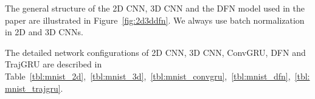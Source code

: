 \documentclass{article}
\begin{document}
The general structure of the 2D CNN, 3D CNN and the DFN model used in the paper are illustrated in Figure~\ref{fig:2d3ddfn}. We always use batch normalization~\cite{ioffe2015batch} in 2D and 3D CNNs.

The detailed network configurations of 2D CNN, 3D CNN, ConvGRU, DFN and TrajGRU are described in Table~\ref{tbl:mnist_2d},~\ref{tbl:mnist_3d},~\ref{tbl:mnist_convgru},~\ref{tbl:mnist_dfn},~\ref{tbl:mnist_trajgru}.

\begin{table}[h!]
  \centering
  \caption{The details of the 2D CNN model. The two dimensions
    in kernel, stride, pad and other features represent for height and width. We
    set the base filter number  to 70. We derive the 2D model from the 3D model
    by multiplying the number of channels with the respective kernel size of the
    3D model. The 10 channels in the input of `enc1' and the output of `vid5' correspond to the input
    and output frames, respectively.}
  \label{tbl:mnist_2d}
\end{table}
\end{document}
